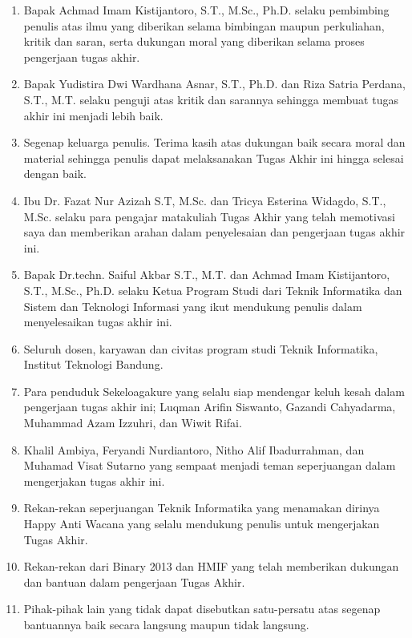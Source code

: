 \begin{enumerate}
    \item Bapak Achmad Imam Kistijantoro, S.T., M.Sc., Ph.D. selaku pembimbing penulis atas ilmu yang diberikan selama bimbingan maupun perkuliahan, kritik dan saran, serta dukungan moral yang diberikan selama proses pengerjaan tugas akhir.

    \item Bapak Yudistira Dwi Wardhana Asnar, S.T., Ph.D. dan Riza Satria Perdana, S.T., M.T. selaku penguji atas kritik dan sarannya sehingga membuat tugas akhir ini menjadi lebih baik.

    \item Segenap keluarga penulis. Terima kasih atas dukungan baik secara moral dan material sehingga penulis dapat melaksanakan Tugas Akhir ini hingga selesai dengan baik.
    
    \item Ibu Dr. Fazat Nur Azizah S.T, M.Sc. dan Tricya Esterina Widagdo, S.T., M.Sc. selaku para pengajar matakuliah Tugas Akhir yang telah memotivasi saya dan memberikan arahan dalam penyelesaian dan pengerjaan tugas akhir ini.
    
	\item Bapak Dr.techn. Saiful Akbar S.T., M.T. dan Achmad Imam Kistijantoro, S.T., M.Sc., Ph.D. selaku Ketua Program Studi dari Teknik Informatika dan Sistem dan Teknologi Informasi yang ikut mendukung penulis dalam menyelesaikan tugas akhir ini.
    
    \item Seluruh dosen, karyawan dan civitas program studi Teknik Informatika, Institut Teknologi Bandung.
    
    \item Para penduduk Sekeloagakure yang selalu siap mendengar keluh kesah dalam pengerjaan tugas akhir ini; Luqman Arifin Siswanto, Gazandi Cahyadarma, Muhammad Azam Izzuhri, dan Wiwit Rifai.

    \item Khalil Ambiya, Feryandi Nurdiantoro, Nitho Alif Ibadurrahman, dan Muhamad Visat Sutarno yang sempaat menjadi teman seperjuangan dalam mengerjakan tugas akhir ini.
    
    \item Rekan-rekan seperjuangan Teknik Informatika yang menamakan dirinya Happy Anti Wacana yang selalu mendukung penulis untuk mengerjakan Tugas Akhir.
    
    \item Rekan-rekan dari Binary 2013 dan HMIF yang telah memberikan dukungan dan bantuan dalam pengerjaan Tugas Akhir.
    
    \item Pihak-pihak lain yang tidak dapat disebutkan satu-persatu atas segenap bantuannya baik secara langsung maupun tidak langsung.
\end{enumerate}

